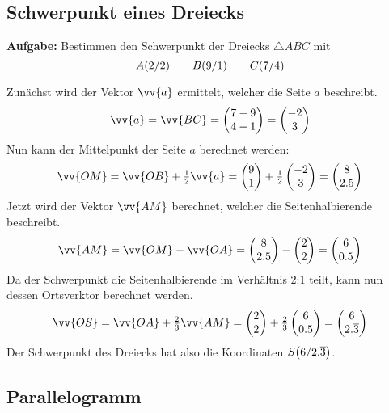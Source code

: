 \subsection{Schwerpunkt eines Dreiecks}
\textbf{Aufgabe:} Bestimmen den Schwerpunkt der Dreiecks $\triangle ABC$ mit
\[
  \pxy[A]{2,2} \qquad \pxy[B]{9,1} \qquad \pxy[C]{7,4}
\]
\begin{center}
\end{center}
Zunächst wird der Vektor $\vv{a}$ ermittelt, welcher die Seite $a$ beschreibt.
\[
  \vv{a} = \vv{BC} = \vxy{7-9,4-1} = \vxy{-2,3}
\]
Nun kann der Mittelpunkt der Seite $a$ berechnet werden:
\[
  \vv{OM} = \vv{OB}+\tfrac{1}{2}\vv{a} = \vxy{9,1}+\tfrac{1}{2}\vxy{-2,3} = \vxy{8,2.5}
\]
Jetzt wird der Vektor $\vv{AM}$ berechnet, welcher die Seitenhalbierende beschreibt.
\[
  \vv{AM} = \vv{OM}-\vv{OA} = \vxy{8,2.5}-\vxy{2,2} = \vxy{6,0.5}
\]
Da der Schwerpunkt die Seitenhalbierende im Verhältnis 2:1 teilt, kann nun dessen Ortsverktor berechnet werden.
\[
  \vv{OS} = \vv{OA}+\tfrac{2}{3}\vv{AM} = \vxy{2,2}+\tfrac{2}{3}\vxy{6,0.5} = \vxy{6,2.\overline{3}}
\]
Der Schwerpunkt des Dreiecks hat also die Koordinaten $\pxy[S]{6,2.\overline{3}}$.
\newpage
\subsection{Parallelogramm}

